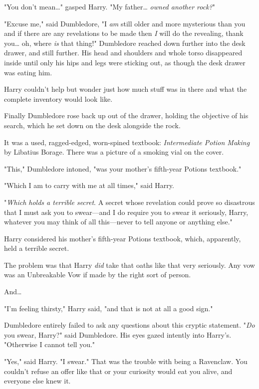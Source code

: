 "You don't mean{\ldots}" gasped Harry. "My father{\ldots} \emph{owned another 
rock?}"

"Excuse me," said Dumbledore, "I \emph{am} still older and more mysterious than 
you and if there are any revelations to be made then \emph{I} will do the 
revealing, thank you{\ldots} oh, where \emph{is} that thing!" Dumbledore 
reached down further into the desk drawer, and still further. His head and 
shoulders and whole torso disappeared inside until only his hips and legs were 
sticking out, as though the desk drawer was eating him.

Harry couldn't help but wonder just how much stuff was in there and what the 
complete inventory would look like.

Finally Dumbledore rose back up out of the drawer, holding the objective of his 
search, which he set down on the desk alongside the rock.

It was a used, ragged-edged, worn-spined textbook: \emph{Intermediate Potion 
Making} by Libatius Borage. There was a picture of a smoking vial on the cover.

"This," Dumbledore intoned, "was your mother's fifth-year Potions textbook."

"Which I am to carry with me at all times," said Harry.

"\emph{Which holds a terrible secret}. A secret whose revelation could prove so 
disastrous that I must ask you to swear---and I do require you to swear it 
seriously, Harry, whatever you may think of all this---never to tell anyone or 
anything else."

Harry considered his mother's fifth-year Potions textbook, which, apparently, 
held a terrible secret.

The problem was that Harry \emph{did} take that oaths like that very seriously. 
Any vow was an Unbreakable Vow if made by the right sort of person.

And{\ldots}

"I'm feeling thirsty," Harry said, "and that is not at all a good sign."

Dumbledore entirely failed to ask any questions about this cryptic statement. 
"\emph{Do} you swear, Harry?" said Dumbledore. His eyes gazed intently into 
Harry's. "Otherwise I cannot tell you."

"Yes," said Harry. "I swear." That was the trouble with being a Ravenclaw. You 
couldn't refuse an offer like that or your curiosity would eat you alive, and 
everyone else knew it.

